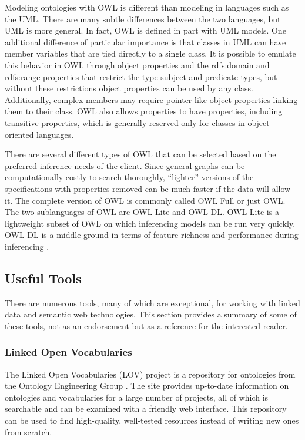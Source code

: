 Modeling ontologies with OWL is different than modeling in languages such as the
UML. There are many subtle differences
between the two languages, but UML is more general. In fact, OWL is
defined in part with UML models. One additional difference of particular
importance is that classes in UML can have member variables that are tied
directly to a single class. It is possible to emulate this behavior in OWL
through object properties and the rdfs:domain and rdfs:range properties that
restrict the type subject and predicate types, but without these restrictions
object properties can be used by any class. Additionally, complex members
may require pointer-like object properties linking them to their class. OWL also
allows properties to have properties, including transitive properties, which is
generally reserved only for classes in object-oriented languages.

There are several different types of OWL that can be selected based on the
preferred inference needs of the client. Since general graphs can be
computationally costly to search thoroughly, ``lighter'' versions of the
specifications with properties removed can be much faster if the data will allow
it. The complete version of OWL is commonly called OWL Full or just OWL. The two
sublanguages of OWL are OWL Lite and OWL DL. OWL Lite is a lightweight subset
of OWL on which inferencing models can be run very quickly. OWL DL
is a middle ground in terms of feature richness and performance
during inferencing \cite{noauthor_owl_nodate-2}.

\subsection{Useful Tools}

There are numerous tools, many of which are exceptional, for working with linked
data and semantic web technologies. This section provides a summary of some of
these tools, not as an endorsement but as a reference for the interested reader.

\subsubsection{Linked Open Vocabularies}

The Linked Open Vocabularies (LOV) project is a repository for ontologies from
the Ontology Engineering Group \cite{noauthor_linked_nodate-1}. The site
provides up-to-date information on ontologies and vocabularies for a large number of projects, all
of which is searchable and can be examined with a friendly web interface. This
repository can be used to find high-quality, well-tested resources instead of
writing new ones from scratch.

